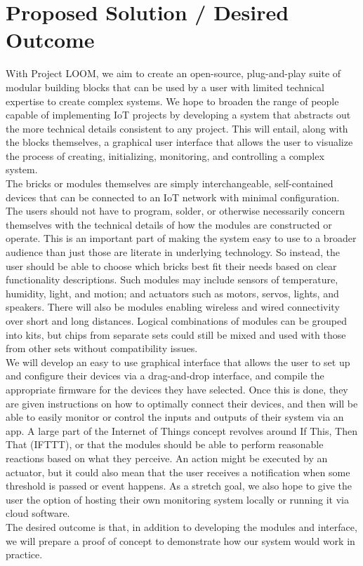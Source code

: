 \documentclass[onecolumn, draftclsnofoot,10pt, compsoc]{IEEEtran}
\begin{document}
\section{Proposed Solution / Desired Outcome}
    With Project LOOM, we aim to create an open-source, plug-and-play suite of modular building blocks that can be used by a user with limited technical expertise to create complex systems. We hope to broaden the range of people capable of implementing IoT projects by developing a system that abstracts out the more technical details consistent to any project. This will entail, along with the blocks themselves, a graphical user interface that allows the user to visualize the process of creating, initializing, monitoring, and controlling a complex system.\\
    The bricks or modules themselves are simply interchangeable, self-contained devices that can be connected to an IoT network with minimal configuration. The users should not have to program, solder, or otherwise necessarily concern themselves with the technical details of how the modules are constructed or operate. This is an important part of making the system easy to use to a broader audience than just those are literate in underlying technology. So instead, the user should be able to choose which bricks best fit their needs based on clear functionality descriptions. Such modules may include sensors of temperature, humidity, light, and motion; and actuators such as motors, servos, lights, and speakers. There will also be modules enabling wireless and wired connectivity over short and long distances. Logical combinations of modules can be grouped into kits, but chips from separate sets could still be mixed and used with those from other sets without compatibility issues. \\
    We will develop an easy to use graphical interface that allows the user to set up and configure their devices via a drag-and-drop interface, and compile the appropriate firmware for the devices they have selected. Once this is done, they are given instructions on how to optimally connect their devices, and then will be able to easily monitor or control the inputs and outputs of their system via an app. A large part of the Internet of Things concept revolves around If This, Then That (IFTTT), or that the modules should be able to perform reasonable reactions based on what they perceive. An action might be executed by an actuator, but it could also mean that the user receives a notification when some threshold is passed or event happens. As a stretch goal, we also hope to give the user the option of hosting their own monitoring system locally or running it via cloud software.\\
    The desired outcome is that, in addition to developing the modules and interface, we will prepare a proof of concept to demonstrate how our system would work in practice.
\end{document}

